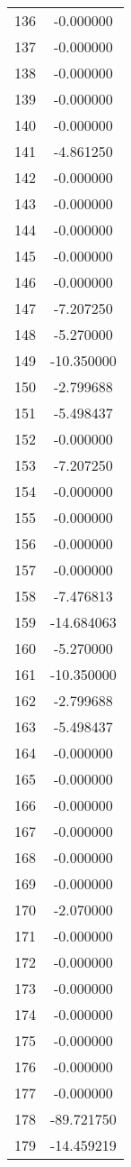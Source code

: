 \documentclass[12pt]{article}
\begin{document}
\begin{longtable}{@{}cc@{}}
136 & -0.000000 \\
137 & -0.000000 \\
138 & -0.000000 \\
139 & -0.000000 \\
140 & -0.000000 \\
141 & -4.861250 \\
142 & -0.000000 \\
143 & -0.000000 \\
144 & -0.000000 \\
145 & -0.000000 \\
146 & -0.000000 \\
147 & -7.207250 \\
148 & -5.270000 \\
149 & -10.350000 \\
150 & -2.799688 \\
151 & -5.498437 \\
152 & -0.000000 \\
153 & -7.207250 \\
154 & -0.000000 \\
155 & -0.000000 \\
156 & -0.000000 \\
157 & -0.000000 \\
158 & -7.476813 \\
159 & -14.684063 \\
160 & -5.270000 \\
161 & -10.350000 \\
162 & -2.799688 \\
163 & -5.498437 \\
164 & -0.000000 \\
165 & -0.000000 \\
166 & -0.000000 \\
167 & -0.000000 \\
168 & -0.000000 \\
169 & -0.000000 \\
170 & -2.070000 \\
171 & -0.000000 \\
172 & -0.000000 \\
173 & -0.000000 \\
174 & -0.000000 \\
175 & -0.000000 \\
176 & -0.000000 \\
177 & -0.000000 \\
178 & -89.721750 \\
179 & -14.459219 \\

\end{longtable}
\end{document}
